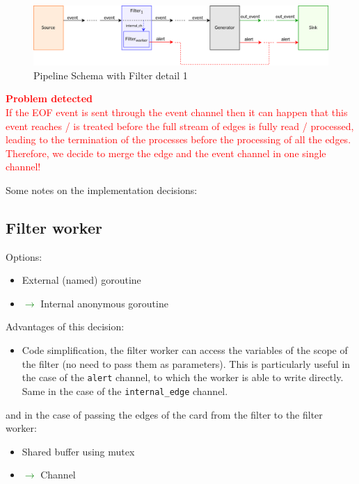 \begin{figure}[H]
  \centering
  \includegraphics[scale = 0.7]{images/3-Engine/pipeline-schema-filter-detail-1.png}
  \caption{Pipeline Schema with Filter detail 1}
  \label{img:pipeline-schema-1}
\end{figure}


\textcolor{red}{\textbf{Problem detected}\\
If the EOF event is sent through the event channel then it can happen that this event reaches / is treated before the full stream of edges is fully read / processed, leading to
the termination of the processes before the processing of all the edges.\\
Therefore, we decide to merge the edge and the event channel in one single channel!}

Some notes on the implementation decisions:

\subsection{Filter worker}

Options:

\begin{itemize}
  \item External (named) goroutine
  \item \textcolor{green}{$\rightarrow$} Internal anonymous goroutine
\end{itemize}

Advantages of this decision:
\begin{itemize}
  \item Code simplification, the filter worker can access the variables of the scope of the
  filter (no need to pass them as parameters). This is particularly useful in the case of the \texttt{alert} channel, to which the worker is able to write directly. Same in the case of the \texttt{internal\_edge} channel.
\end{itemize}

and in the case of passing the edges of the card from the filter to the filter worker:
\begin{itemize}
  \item Shared buffer using mutex
  \item \textcolor{green}{$\rightarrow$} Channel 
\end{itemize}

